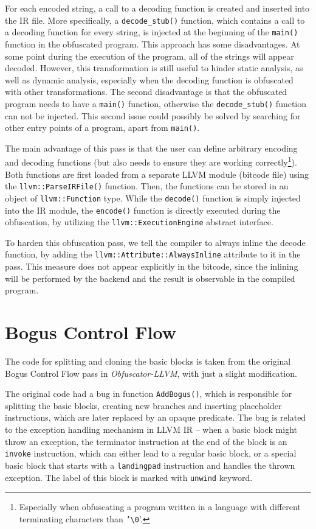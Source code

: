 \documentclass[
  digital, %
  notable,   %
  twoside, %
  nolof,     %
  nolot,     %
]{fithesis3}
\theoremstyle{definition}
\begin{document}
For each encoded string, a call to a decoding function is created and inserted into the IR file. More specifically, a \texttt{decode\_stub()} function, which contains a call to a decoding function for every string, is injected at the beginning of the \texttt{main()} function in the obfuscated program. This approach has some disadvantages. At some point during the execution of the program, all of the strings will appear decoded. However, this transformation is still useful to hinder static analysis, as well as dynamic analysis, especially when the decoding function is obfuscated with other transformations. The second disadvantage is that the obfuscated program needs to have a \texttt{main()} function, otherwise the \texttt{decode\_stub()} function can not be injected. This second issue could possibly be solved by searching for other entry points of a program, apart from \texttt{main()}.

The main advantage of this pass is that the user can define arbitrary encoding and decoding functions (but also needs to ensure they are working correctly\footnote{Especially when obfuscating a program written in a language with different terminating characters than \texttt{'\textbackslash0}'.}). Both functions are first loaded from a separate LLVM module (bitcode file) using the \texttt{llvm::ParseIRFile()} function. Then, the functions can be stored in an object of \texttt{llvm::Function} type. While the \texttt{decode()} function is simply injected into the IR module, the \texttt{encode()} function is directly executed during the obfuscation, by utilizing the \texttt{llvm::ExecutionEngine} abstract interface.

To harden this obfuscation pass, we tell the compiler to always inline the decode function, by adding the \texttt{llvm::Attribute::AlwaysInline} attribute to it in the pass. This measure does not appear explicitly in the bitcode, since the inlining will be performed by the backend and the result is observable in the compiled program. 

\section{Bogus Control Flow}
The code for splitting and cloning the basic blocks is taken from the original Bogus Control Flow pass in \textit{Obfuscator-LLVM}, with just a slight modification. 

The original code had a bug in function \texttt{AddBogus()}, which is responsible for splitting the basic blocks, creating new branches and inserting placeholder instructions, which are later replaced by an opaque predicate. The bug is related to the exception handling mechanism in LLVM IR -- when a basic block might throw an exception, the terminator instruction at the end of the block is an \texttt{invoke} instruction, which can either lead to a regular basic block, or a special basic block that starts with a \texttt{landingpad} instruction and handles the thrown exception. The label of this block is marked with \texttt{unwind} keyword. 
\end{document}
